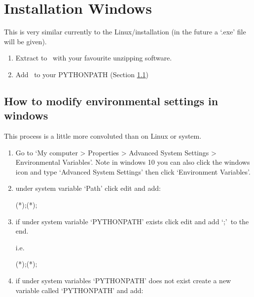 \clearpage
\newpage
\section{Installation Windows}
\label{ch:install:install_win}

This is very similar currently to the Linux/\mac installation (in the future a `.exe' file will be given).

\begin{enumerate}
\item Extract to \InstallDIR\, with your favourite unzipping software.
\item Add \InstallDIR\, to your PYTHONPATH (Section \ref{ch:install:install_win:environ_settings})
\end{enumerate}

\subsection{How to modify environmental settings in windows}
\label{ch:install:install_win:environ_settings}

This process is a little more convoluted than on Linux or \mac system.

\begin{enumerate}
\item Go to `My computer > Properties > Advanced System Settings > Environmental Variables'. Note in windows 10 you can also click the windows icon and type `Advanced System Settings' then click `Environment Variables'.


\item under system variable `Path' click edit and add:
\begin{textbox}[title={In "Environmental Variables"}]
(*\InstallDIR*);(*\InstallDIR*)\bin;
\end{textbox}

\item if under system variable `PYTHONPATH' exists click edit and add `\InstallDIR;'\, to the end.

\noindent i.e.

\begin{textbox}[title={In "Environmental Variables"}]
(*\InstallDIR*);(*\InstallDIR*)\bin;
\end{textbox}

\item if under system variables `PYTHONPATH' does not exist create a new variable called `PYTHONPATH' and add:

\begin{textbox}[title={In "Environmental Variables"}]
\end{textbox}

\end{enumerate}

